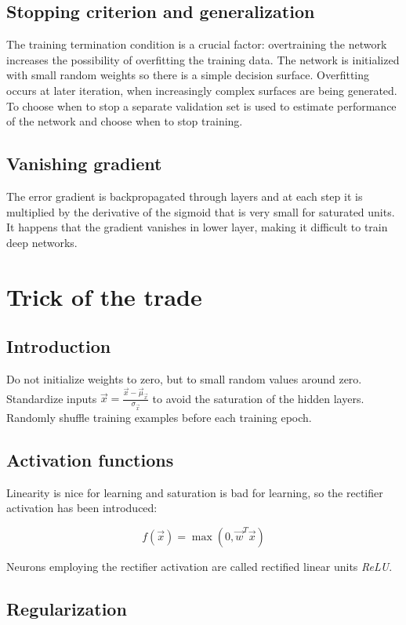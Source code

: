 	\subsection{Stopping criterion and generalization}
	The training termination condition is a crucial factor: overtraining the network increases the possibility of overfitting the training data.
	The network is initialized with small random weights so there is a simple decision surface.
	Overfitting occurs at later iteration, when increasingly complex surfaces are being generated.
	To choose when to stop a separate validation set is used to estimate performance of the network and choose when to stop training.

	\subsection{Vanishing gradient}
	The error gradient is backpropagated through layers and at each step it is multiplied by the derivative of the sigmoid that is very small for saturated units.
	It happens that the gradient vanishes in lower layer, making it difficult to train deep networks.

\section{Trick of the trade}

	\subsection{Introduction}
	Do not initialize weights to zero, but to small random values around zero.
	Standardize inputs $\vec{x} = \frac{\vec{x}-\vec{\mu}_{\vec{x}}}{\sigma_{\vec{x}}}$ to avoid the saturation of the hidden layers.
	Randomly shuffle training examples before each training epoch.

	\subsection{Activation functions}
	Linearity is nice for learning and saturation is bad for learning, so the rectifier activation has been introduced:

	$$f(\vec{x}) = \max(0,\vec{w}^T\vec{x})$$

	Neurons employing the rectifier activation are called rectified linear units \emph{ReLU}.

	\subsection{Regularization}
	
